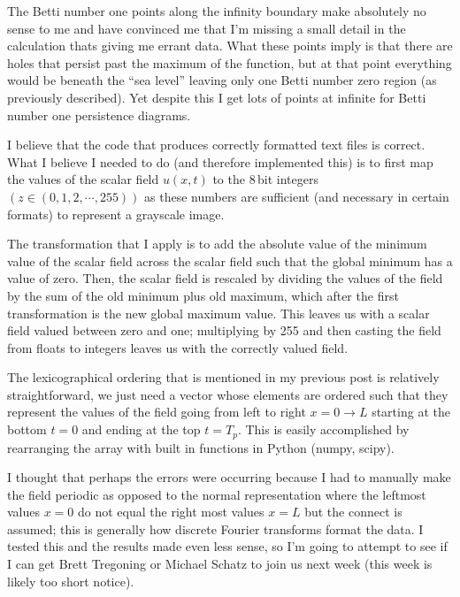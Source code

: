 \begin{description}
{The Betti number one points along the infinity boundary make absolutely no sense to me and have convinced me that
I'm missing a small detail in the calculation thats giving me errant data. What these points imply is that there are holes
that persist past the maximum of the function, but at that point everything would be beneath the ``sea level'' leaving only
one Betti number zero region (as previously described). Yet despite this I get lots of points at infinite for Betti number one
persistence diagrams.

I believe that the code that produces correctly formatted text files is
correct. What I believe I needed to do (and therefore implemented this) is to
first map the values of the scalar field $u(x,t)$ to the 8\,bit integers $(z
\in (0,1, 2, \cdots, 255))$ as these numbers are sufficient (and necessary in
certain formats) to represent a grayscale image.

The transformation that I apply is to add the absolute value of the minimum value of the scalar field across the scalar field such that the global
minimum has a value of zero. Then, the scalar field is rescaled by dividing the values of the field by the sum of the old minimum plus old maximum,
which after the first transformation is the new global maximum value. This leaves us with a scalar field valued between zero and one; multiplying
by 255 and then casting the field from floats to integers leaves us with the correctly valued field.

The lexicographical ordering that is mentioned in my previous post is relatively straightforward, we just need a vector whose elements are ordered
such that they represent the values of the field going from left to right $x=0\rightarrow L$ starting at the bottom $t=0$ and ending at the top $t=T_p$.
This is easily accomplished by rearranging the array with built in functions in Python (numpy, scipy).

I thought that perhaps the errors were occurring because I had to manually make the field periodic as opposed to the normal representation where
the leftmost values $x=0$ do not equal the right most values $x=L$ but the connect is assumed; this is generally how discrete Fourier transforms
format the data. I tested this and the results made even less sense, so I'm going to attempt to see if I can get Brett Tregoning or Michael Schatz to
join us next week (this week is likely too short notice).
}

\end{description}
